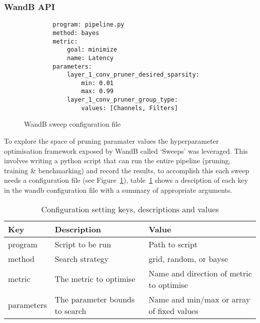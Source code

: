 \documentclass[../Dissertation.tex]{subfiles}
\begin{document}
\newpage
\subsubsection{WandB API}

\singlespacing
\begin{figure}[H]
    \begin{verbatim}
        program: pipeline.py
        method: bayes
        metric:
            goal: minimize
            name: Latency
        parameters:
            layer_1_conv_pruner_desired_sparsity:
                min: 0.01
                max: 0.99
            layer_1_conv_pruner_group_type:
                values: [Channels, Filters]
    \end{verbatim}
    \caption{WandB sweep configuration file}
    \label{fig:sweepConfig}
\end{figure}
\doublespacing

To explore the space of pruning paramater values the hyperparameter optimisation framework exposed by WandB called `Sweeps' was leveraged. 
This involves writing a python script that can run the entire pipeline (pruning, training \& benchmarking) and record the results, to accomplish this each sweep needs a configuration file (see Figure~\ref{fig:sweepConfig}), table~\ref{tab:WandBConfig} shows a desciption of each key in the wandb configuration file with a summary of appropriate arguments. 



\begin{table}[H]
    \begin{tabular}{@{}|l|l|l|@{}}
    \toprule
    Key        & Description                    & Value                                    \\ \midrule
    program    & Script to be run               & Path to script                           \\ \midrule
    method     & Search strategy                & grid, random, or bayse                   \\ \midrule
    metric     & The metric to optimise         & Name and direction of metric to optimise \\ \midrule
    parameters & The parameter bounds to search & Name and min/max or array of fixed values  \\ \bottomrule
    \end{tabular}
    \caption{Configuration setting keys, descriptions and values}
    \label{tab:WandBConfig}
\end{table}
\end{document}
